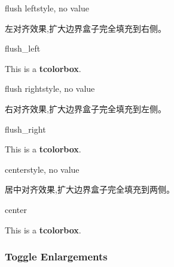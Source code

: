 \begin{docTcbKey}[][doc new=2015-11-20]{flush left}{}{style, no value}

左对齐效果,扩大边界盒子完全填充到右侧。
\begin{exdispExample}{flush_left}

\begin{tcolorbox}[flush left,width=5cm,enhanced,show bounding box]
This is a \textbf{tcolorbox}.
\end{tcolorbox}
\end{exdispExample}
\end{docTcbKey}


\begin{docTcbKey}[][doc new=2015-11-20]{flush right}{}{style, no value}

  右对齐效果,扩大边界盒子完全填充到左侧。
\begin{exdispExample}{flush_right}

\begin{tcolorbox}[flush right,width=5cm,enhanced,show bounding box]
This is a \textbf{tcolorbox}.
\end{tcolorbox}
\end{exdispExample}
\end{docTcbKey}


\begin{docTcbKey}[][doc new=2015-11-20]{center}{}{style, no value}

  居中对齐效果,扩大边界盒子完全填充到两侧。
\begin{exdispExample}{center}

\begin{tcolorbox}[center,width=5cm,enhanced,show bounding box]
This is a \textbf{tcolorbox}.
\end{tcolorbox}
\end{exdispExample}
\end{docTcbKey}





\subsubsection{Toggle Enlargements}


